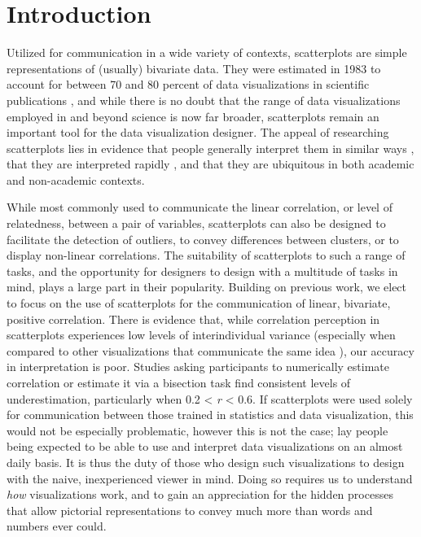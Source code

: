 \documentclass[manuscript,screen,review]{acmart}
\begin{document}
\setlength{\parskip}{-0.1pt}

\section{Introduction}\label{sec-intro-main}

Utilized for communication in a wide variety of contexts, scatterplots
are simple representations of (usually) bivariate data. They were
estimated in 1983 to account for between 70 and 80 percent of data
visualizations in scientific publications \citep{tufte_1986}, and while
there is no doubt that the range of data visualizations employed in and
beyond science is now far broader, scatterplots remain an important tool
for the data visualization designer. The appeal of researching
scatterplots lies in evidence that people generally interpret them in
similar ways \citep{kay_2015}, that they are interpreted rapidly
\citep{rensink_2014}, and that they are ubiquitous in both academic
\citep{tufte_1986} and non-academic contexts.

While most commonly used to communicate the linear correlation, or level
of relatedness, between a pair of variables, scatterplots can also be
designed to facilitate the detection of outliers, to convey differences
between clusters, or to display non-linear correlations. The suitability
of scatterplots to such a range of tasks, and the opportunity for
designers to design with a multitude of tasks in mind, plays a large
part in their popularity. Building on previous work, we elect to focus
on the use of scatterplots for the communication of linear, bivariate,
positive correlation. There is evidence that, while correlation
perception in scatterplots experiences low levels of interindividual
variance (especially when compared to other visualizations that
communicate the same idea \citep{harrison_2014, kay_2015}), our accuracy
in interpretation is poor. Studies asking participants to numerically
estimate correlation
\citep{strahan_1978, bobko_1979, cleveland_1982, lane_1985, lauer_1989, collyer_1990, meyer_1992}
or estimate it via a bisection task \citep{rensink_2017} find consistent
levels of underestimation, particularly when 0.2 \textless{} \emph{r}
\textless{} 0.6. If scatterplots were used solely for communication
between those trained in statistics and data visualization, this would
not be especially problematic, however this is not the case; lay people
being expected to be able to use and interpret data visualizations on an
almost daily basis. It is thus the duty of those who design such
visualizations to design with the naive, inexperienced viewer in mind.
Doing so requires us to understand \emph{how} visualizations work, and
to gain an appreciation for the hidden processes that allow pictorial
representations to convey much more than words and numbers ever could.
\end{document}
